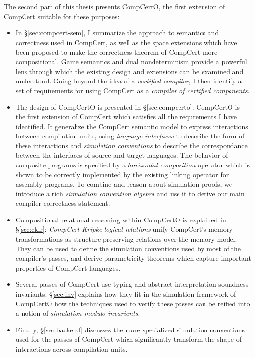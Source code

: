 \documentclass[draft,11pt]{report}
\begin{document}
The second part of this thesis presents CompCertO,
the first extension of CompCert suitable for
these purposes:
\begin{itemize}
\item
  In \S\ref{sec:compcert-sem},
  I summarize the approach to semantics and correctness
  used in CompCert,
  as well as the space extensions
  which have been proposed
  to make the correctness theorem of CompCert
  more compositional.
  Game semantics and dual nondeterminism
  provide a powerful lens
  through which the existing design and extensions
  can be examined and understood.
  Going beyond the idea of a
  \emph{certified compiler},
  I then identify a set of requirements
  for using CompCert as a
  \emph{compiler of certified components}.
\item
  The design of CompCertO is presented in \S\ref{sec:compcerto}.
  CompCertO is the first extension of CompCert which
  satisfies all the requrements I have identified.
  It generalize the CompCert semantic model
  to express interactions between compilation units,
  using \emph{language interfaces}
  to describe the form of these interactions
  and \emph{simulation conventions}
  to describe the correspondance between the interfaces
  of source and target languages.
  The behavior of
  composite programs is specified by a
  \emph{horizontal composition} operator
  which is shown to be correctly implemented
  by the existing linking operator for assembly programs.
  To combine and reason about simulation proofs,
  we introduce a rich \emph{simulation convention algebra}
  and use it to derive our main compiler correctness statement.
\item
  Compositional relational reasoning within CompCertO
  is explained in \S\ref{sec:cklr}:
  \emph{CompCert Kripke logical relations}
  unify CompCert's memory transformations
  as structure-preserving relations
  over the memory model.
  They can be used to define the simulation conventions
  used by most of the compiler's passes,
  and derive parametricity theorems which capture
  important properties of CompCert languages.
\item
  Several passes of CompCert use
  typing and abstract interpretation soundness invariants.
  \S\ref{sec:inv} explains how they fit
  in the simulation framework of CompCertO
  how the techniques used to verify these passes
  can be reified into a notion of
  \emph{simulation modulo invariants}.
\item
  Finally, \S\ref{sec:backend}
  discusses the more specialized simulation conventions
  used for the passes of CompCert which significantly transform
  the shape of interactions across compilation units.
\end{itemize}
\end{document}
